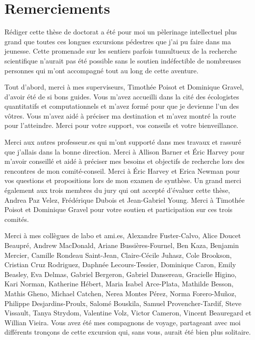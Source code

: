 \documentclass[12pt,twoside,phd]{dms}
\numberwithin{equation}{section}
\numberwithin{table}{chapter}
\numberwithin{figure}{chapter}
\begin{document}

\setlength{\parskip}{6pt} %

\chapter*{Remerciements}

Rédiger cette thèse de doctorat a été pour moi un pèlerinage intellectuel plus
grand que toutes ces longues excursions pédestres que j'ai pu faire dans ma
jeunesse. Cette promenade sur les sentiers parfois tumultueux de la recherche
scientifique n'aurait pas été possible sans le soutien indéfectible de
nombreuses personnes qui m'ont accompagné tout au long de cette aventure.

Tout d'abord, merci à mes superviseurs, Timothée Poisot et Dominique Gravel,
d'avoir été de si bons guides. Vous m'avez accueilli dans la cité des
écologistes quantitatifs et computationnels et m'avez formé pour que je devienne
l'un des vôtres. Vous m'avez aidé à préciser ma destination et m'avez montré la
route pour l'atteindre. Merci pour votre support, vos conseils et votre
bienveillance.

Merci aux autres professeur.es qui m'ont supporté dans mes travaux et rassuré
que j'allais dans la bonne direction. Merci à Allison Barner et Éric Harvey pour
m'avoir conseillé et aidé à préciser mes besoins et objectifs de recherche lors
des rencontres de mon comité-conseil. Merci à Éric Harvey et Erica Newman pour
vos questions et propositions lors de mon examen de synthèse. Un grand merci
également aux trois membres du jury qui ont accepté d'évaluer cette thèse,
Andrea Paz Velez, Frédérique Dubois et Jean-Gabriel Young. Merci à Timothée
Poisot et Dominique Gravel pour votre soutien et participation sur ces trois
comités.

Merci à mes collègues de labo et ami.es, Alexandre Fuster-Calvo, Alice Doucet
Beaupré, Andrew MacDonald, Ariane Bussières-Fournel, Ben Kaza, Benjamin Mercier,
Camille Rondeau Saint-Jean, Claire-Cécile Juhasz, Cole Brookson, Cristian Cruz
Rodriguez, Daphnée Lecours-Tessier, Dominique Caron, Emily Beasley, Eva Delmas,
Gabriel Bergeron, Gabriel Dansereau, Gracielle Higino, Kari Norman, Katherine
Hébert, Maria Isabel Arce-Plata, Mathilde Besson, Mathis Gheno, Michael Catchen,
Nerea Montes Pérez, Norma Forero-Muñoz, Philippe Desjardins-Proulx, Salomé
Bouskila, Samuel Provencher-Tardif, Steve Vissault, Tanya Strydom, Valentine
Volz, Victor Cameron, Vincent Beauregard et Willian Vieira. Vous avez été mes
compagnons de voyage, partageant avec moi différents tronçons de cette excursion
qui, sans vous, aurait été bien plus solitaire. 
\end{document}

